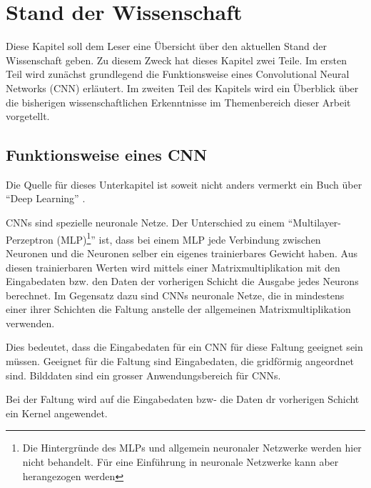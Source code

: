 \chapter{Stand der Wissenschaft}
Diese Kapitel soll dem Leser eine Übersicht über den aktuellen Stand der Wissenschaft geben. Zu diesem Zweck hat dieses Kapitel zwei Teile. Im ersten Teil wird zunächst grundlegend die Funktionsweise eines Convolutional Neural Networks (CNN) erläutert. Im zweiten Teil des Kapitels wird ein Überblick über die bisherigen wissenschaftlichen Erkenntnisse im Themenbereich dieser Arbeit vorgetellt.
\section{Funktionsweise eines CNN}\label{sec:conv}
Die Quelle für dieses Unterkapitel ist soweit nicht anders vermerkt ein Buch über \enquote{Deep Learning} \cite{CNNBook}.

CNNs sind spezielle neuronale Netze. Der Unterschied zu einem \enquote{Multilayer-Perzeptron (MLP)\footnote{Die Hintergründe des MLPs und allgemein neuronaler Netzwerke werden hier nicht behandelt. Für eine Einführung in neuronale Netzwerke kann aber \cite{neural} herangezogen werden}} ist, dass bei einem MLP jede Verbindung zwischen Neuronen und die Neuronen selber ein eigenes trainierbares Gewicht haben. Aus diesen trainierbaren Werten wird mittels einer Matrixmultiplikation mit den Eingabedaten bzw. den Daten der vorherigen Schicht die Ausgabe jedes Neurons berechnet.
Im Gegensatz dazu sind CNNs neuronale Netze, die in mindestens einer ihrer Schichten die Faltung anstelle der allgemeinen Matrixmultiplikation verwenden.


Dies bedeutet, dass die Eingabedaten für ein CNN für diese Faltung geeignet sein müssen. Geeignet für die Faltung sind Eingabedaten, die gridförmig angeordnet sind. Bilddaten sind ein grosser Anwendungsbereich für CNNs.

Bei der Faltung wird auf die Eingabedaten bzw- die Daten dr vorherigen Schicht ein Kernel angewendet.

